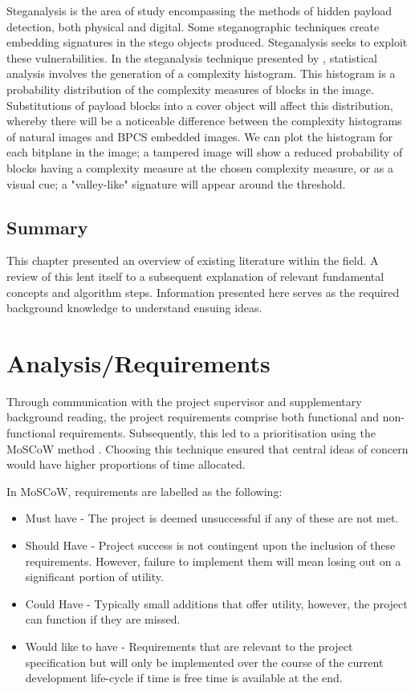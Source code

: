\documentclass{l4proj}
\begin{document}
Steganalysis is the area of study encompassing the methods of hidden payload detection, both physical and digital. Some steganographic techniques create embedding signatures in the stego objects produced. Steganalysis seeks to exploit these vulnerabilities. In the steganalysis technique presented by \citet{inproceedings}, statistical analysis involves the generation of a complexity histogram. This histogram is a probability distribution of the complexity measures of blocks in the image. Substitutions of payload blocks into a cover object will affect this distribution, whereby there will be a noticeable difference between the complexity histograms of natural images and BPCS embedded images. We can plot the histogram for each bitplane in the image; a tampered image will show a reduced probability of blocks having a complexity measure at the chosen complexity measure, or as a visual cue; a "valley-like" signature will appear around the threshold.

\section{Summary}

This chapter presented an overview of existing literature within the field. A review of this lent itself to a subsequent explanation of relevant fundamental concepts and algorithm steps. Information presented here serves as the required background knowledge to understand ensuing ideas.

\chapter{Analysis/Requirements} \label{Analysis}

Through communication with the project supervisor and supplementary background reading, the project requirements comprise both functional and non-functional requirements. Subsequently, this led to a prioritisation using the MoSCoW method \citep{moscow}. Choosing this technique ensured that central ideas of concern would have higher proportions of time allocated.  

In MoSCoW, requirements are labelled as the following:
\begin{itemize}
    \item Must have - The project is deemed unsuccessful if any of these are not met.
    \item Should Have - Project success is not contingent upon the inclusion of these requirements. However, failure to implement them will mean losing out on a significant portion of utility.
    \item Could Have - Typically small additions that offer utility, however, the project can function if they are missed.
    \item Would like to have - Requirements that are relevant to the project specification but will only be implemented over the course of the current development life-cycle if time is free time is available at the end.
\end{itemize}
\end{document}

